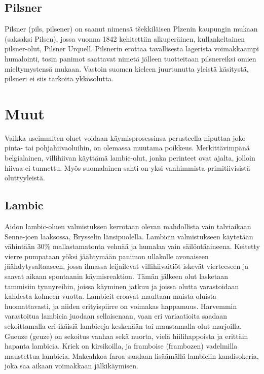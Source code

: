 \documentclass[a4paper,11pt]{report}
\begin{document}
\subsection*{Pilsner}

Pilsner (pils, pilsener) on saanut nimensä tšekkiläisen Plzenin kaupungin mukaan (saksaksi Pilsen), jossa vuonna 1842 kehitettiin alkuperäinen, kullankeltainen pilsner-olut, Pilsner Urquell. Pilsnerin erottaa tavallisesta lagerista voimakkaampi humalointi, tosin panimot saattavat nimetä jälleen tuotteitaan pilsnereiksi omien mieltymystensä mukaan. Vastoin suomen kieleen juurtunutta yleistä käsitystä, pilsneri ei siis tarkoita ykkösolutta.


\section{Muut}

Vaikka useimmiten oluet voidaan käymisprosessinsa perusteella niputtaa joko pinta- tai pohjahiivaoluihin, on olemassa muutama poikkeus. Merkittävimpänä belgialainen, villihiivan käyttämä lambic-olut, jonka perinteet ovat ajalta, jolloin hiivaa ei tunnettu. Myös suomalainen sahti on yksi vanhimmista primitiivisistä oluttyyleistä.

\subsection*{Lambic}

Aidon lambic-oluen valmistuksen kerrotaan olevan mahdollista vain talviaikaan Senne-joen laaksossa, Brysselin länsipuolella. Lambicin valmistukseen käytetään vähintään 30\% mallastamatonta vehnää ja humalaa vain säilöntäaineena. Keitetty vierre pumpataan yöksi jäähtymään panimon ullakolle avonaiseen jäähdytysaltaaseen, jossa ilmassa leijailevat villihiivaitiöt iskevät vierteeseen ja saavat aikaan spontaanin käymisreaktion. Tämän jälkeen olut lasketaan tammisiin tynnyreihin, joissa käyminen jatkuu ja joissa olutta varastoidaan kahdesta kolmeen vuotta. Lambicit eroavat maultaan muista oluista huomattavasti, ja niiden erityispiirre on voimakas happamuus. Harvemmin varastoitua lambicia juodaan sellaisenaan, vaan eri variaatioita saadaan sekoittamalla eri-ikäisiä lambiceja keskenään tai maustamalla olut marjoilla. Gueuze (geuze) on sekoitus vanhaa sekä nuorta, vielä hiilihappoista ja erittäin hapanta lambicia. Kriek on kirsikoilla, ja framboise (frambozen) vadelmilla maustettua lambicia. Makeahkoa faroa saadaan lisäämällä lambiciin kandisokeria, joka saa aikaan voimakkaan jälkikäymisen.
\end{document}
